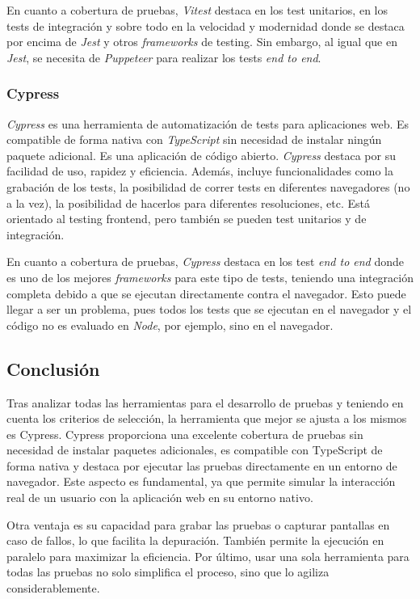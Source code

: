 En cuanto a cobertura de pruebas, \textit{Vitest} destaca en los test unitarios, en los tests de integración y sobre todo en la velocidad y modernidad donde se destaca por encima de \textit{Jest} y otros \textit{frameworks} de testing. Sin embargo, al igual que en \textit{Jest}, se necesita de \textit{Puppeteer} para realizar los tests \textit{end to end}.

\subsubsection{Cypress}

\textit{Cypress} es una herramienta de automatización de tests para aplicaciones web. Es compatible de forma nativa con \textit{TypeScript} sin necesidad de instalar ningún paquete adicional. Es una aplicación de código abierto. \textit{Cypress} destaca por su facilidad de uso, rapidez y eficiencia. Además, incluye funcionalidades como la grabación de los tests, la posibilidad de correr tests en diferentes navegadores (no a la vez), la posibilidad de hacerlos para diferentes resoluciones, etc. Está orientado al testing frontend, pero también se pueden test unitarios y de integración.

En cuanto a cobertura de pruebas, \textit{Cypress} destaca en los test \textit{end to end} donde es uno de los mejores \textit{frameworks} para este tipo de tests, teniendo una integración completa debido a que se ejecutan directamente contra el navegador. Esto puede llegar a ser un problema, pues todos los tests que se ejecutan en el navegador y el código no es evaluado en \textit{Node}, por ejemplo, sino en el navegador.

\subsection{Conclusión}

Tras analizar todas las herramientas para el desarrollo de pruebas y teniendo en cuenta los criterios de selección, la herramienta que mejor se ajusta a los mismos es Cypress. Cypress proporciona una excelente cobertura de pruebas sin necesidad de instalar paquetes adicionales, es compatible con TypeScript de forma nativa y destaca por ejecutar las pruebas directamente en un entorno de navegador. Este aspecto es fundamental, ya que permite simular la interacción real de un usuario con la aplicación web en su entorno nativo.

Otra ventaja es su capacidad para grabar las pruebas o capturar pantallas en caso de fallos, lo que facilita la depuración. También permite la ejecución en paralelo para maximizar la eficiencia. Por último, usar una sola herramienta para todas las pruebas no solo simplifica el proceso, sino que lo agiliza considerablemente.